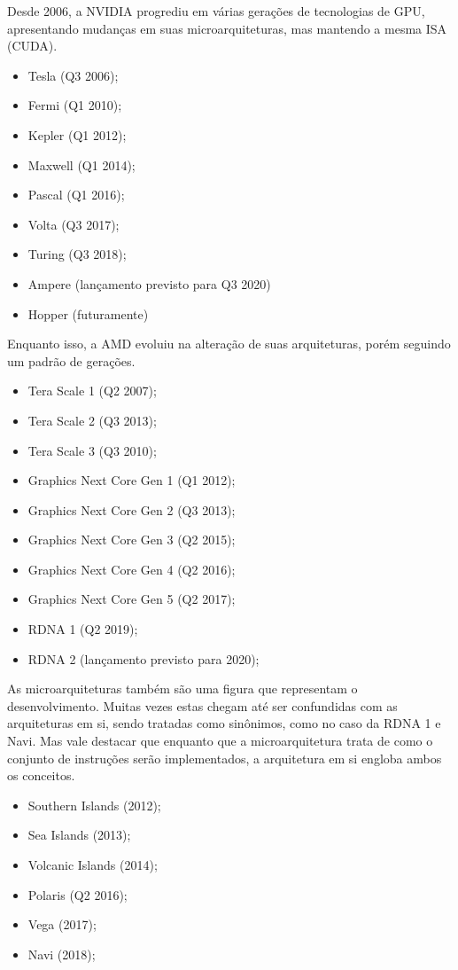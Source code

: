 \documentclass[letterpaper, 10 pt, conference]{ieeeconf}  %
\begin{document}
Desde 2006, a NVIDIA progrediu em várias gerações de tecnologias de GPU, apresentando mudanças em suas microarquiteturas, mas mantendo a mesma ISA (CUDA).

\begin{itemize}
    \item Tesla (Q3 2006);
    \item Fermi (Q1 2010);
    \item Kepler (Q1 2012);
    \item Maxwell (Q1 2014);
    \item Pascal (Q1 2016);
    \item Volta (Q3 2017);
    \item Turing (Q3 2018);
    \item Ampere (lançamento previsto para Q3 2020)
    \item Hopper (futuramente)
\end{itemize}

Enquanto isso, a AMD evoluiu na alteração de suas arquiteturas, porém seguindo um padrão de gerações.

\begin{itemize}
    \item Tera Scale 1 (Q2 2007);
    \item Tera Scale 2 (Q3 2013);
    \item Tera Scale 3 (Q3 2010);
    \item Graphics Next Core Gen 1 (Q1 2012);
    \item Graphics Next Core Gen 2 (Q3 2013);
    \item Graphics Next Core Gen 3 (Q2 2015);
    \item Graphics Next Core Gen 4 (Q2 2016);
    \item Graphics Next Core Gen 5 (Q2 2017);
    \item RDNA 1 (Q2 2019);
    \item RDNA 2 (lançamento previsto para 2020);
\end{itemize}

As microarquiteturas também são uma figura que representam o desenvolvimento. Muitas vezes estas chegam até ser confundidas com as arquiteturas em si, sendo tratadas como sinônimos, como no caso da RDNA 1 e Navi. Mas vale destacar que enquanto que a microarquitetura trata de como o conjunto de instruções serão implementados, a arquitetura em si engloba ambos os conceitos.

\begin{itemize}
    \item Southern Islands (2012);
    \item Sea Islands (2013);
    \item Volcanic Islands (2014);
    \item Polaris (Q2 2016);
    \item Vega (2017);
    \item Navi (2018);
\end{itemize}
\end{document}
